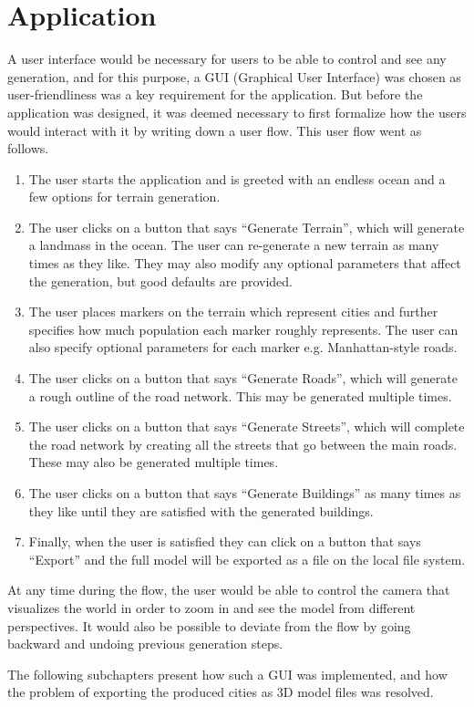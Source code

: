 \section{Application}

A user interface would be necessary for users to be able to control and see any generation, and for this purpose, a GUI (Graphical User Interface) was chosen as user-friendliness was a key requirement for the application.
But before the application was designed, it was deemed necessary to first formalize how the users would interact with it by writing down a user flow.
This user flow went as follows.

\begin{enumerate}
\item The user starts the application and is greeted with an endless ocean and a few options for terrain generation.
\item The user clicks on a button that says “Generate Terrain”, which will generate a landmass in the ocean. The user can re-generate a new terrain as many times as they like. They may also modify any optional parameters that affect the generation, but good defaults are provided.
\item The user places markers on the terrain which represent cities and further specifies how much population each marker roughly represents. The user can also specify optional parameters for each marker e.g. Manhattan-style roads.
\item The user clicks on a button that says “Generate Roads”, which will generate a rough outline of the road network. This may be generated multiple times.
\item The user clicks on a button that says “Generate Streets”, which will complete the road network by creating all the streets that go between the main roads. These may also be generated multiple times.
\item The user clicks on a button that says “Generate Buildings” as many times as they like until they are satisfied with the generated buildings.
\item Finally, when the user is satisfied they can click on a button that says “Export” and the full model will be exported as a file on the local file system.
\end{enumerate}

At any time during the flow, the user would be able to control the camera that visualizes the world in order to zoom in and see the model from different perspectives.
It would also be possible to deviate from the flow by going backward and undoing previous generation steps.

The following subchapters present how such a GUI was implemented, and how the problem of exporting the produced cities as 3D model files was resolved.


